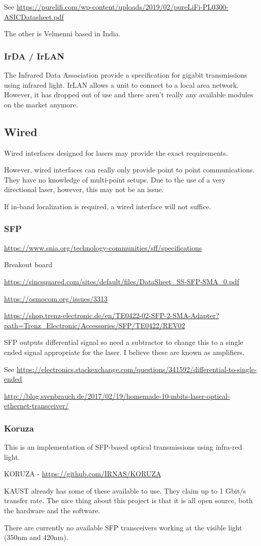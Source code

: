 See \url{https://purelifi.com/wp-content/uploads/2019/02/pureLiFi-PL0300-ASICDatasheet.pdf}

The other is Velmenni based in India.

\subsubsection{IrDA / IrLAN}
The Infrared Data Association provide a specification for gigabit transmissions
using infrared light. IrLAN allows a unit to connect to a local area network.
However, it has dropped out of use and there aren't really any available
modules on the market anymore.

\subsection{Wired}
Wired interfaces designed for lasers may provide the exact requirements.

However, wired interfaces can really only provide point to point
communications. They have no knowledge of multi-point setups. Due to the use
of a very directional laser, however, this may not be an issue.

If in-band localization is required, a wired interface will not suffice.

\subsubsection{\ac{SFP}}

\url{https://www.snia.org/technology-communities/sff/specifications}

Breakout board

\url{https://sincsquared.com/sites/default/files/DataSheet_SS-SFP-SMA_0.pdf}

\url{https://osmocom.org/issues/3313}

\url{https://shop.trenz-electronic.de/en/TE0422-02-SFP-2-SMA-Adapter?path=Trenz_Electronic/Accessories/SFP/TE0422/REV02}

\ac{SFP} outputs differential signal so need a subtractor to change this to
a single ended signal appropriate for the laser. I believe these are known as
amplifiers.

See \url{https://electronics.stackexchange.com/questions/341592/differential-to-single-ended}

\url{http://blog.svenbrauch.de/2017/02/19/homemade-10-mbits-laser-optical-ethernet-transceiver/}

\subsubsection{Koruza}
This is an implementation of \ac{SFP}-based optical transmissions using
infra-red light.

KORUZA - \url{https://github.com/IRNAS/KORUZA}

KAUST already has some of these available to use. They claim up to 1 Gbit/s
transfer rate. The nice thing about this project is that it is all open source,
both the hardware and the software.

There are currently no available \ac{SFP} transceivers working at the visible
light (350nm and 420nm).
